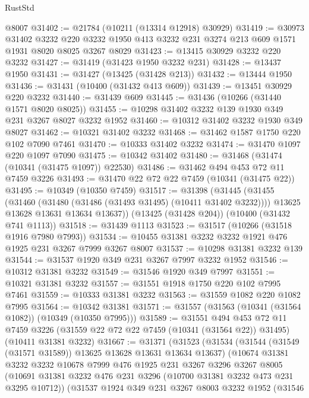 \begin{lexlean}{RustStd}
\begin{coremodule}
{\begin{coremodule}
{{{{{{{{{{{{{{{{{{{{{{{{{    @8007
@31402 := @21784 (@10211 (@13314 @12918) @30929)
@31419 := @30973
    @31402
    @3232
    @220
    @3232
    @1950
    @413
    @3232
    @231
    @3274
    @213
    @609
    @1571
    @1931
    @8020
    @8025
    @3267
    @8029
@31423 := @13415 @30929 @3232 @220 @3232
@31427 := @31419 (@31423 @1950 @3232 @231)
@31428 := @13437 @1950
@31431 := @31427 (@13425 (@31428 @213))
@31432 := @13444 @1950
@31436 := @31431 (@10400 (@31432 @413 @609))
@31439 := @13451 @30929 @220 @3232
@31440 := @31439 @609
@31445 := @31436 (@10266 (@31440 @1571 @8020 @8025))
@31455 := @10298 @31402 @3232 @139 @1930 @349 @231 @3267 @8027 @3232 @1952
@31460 := @10312 @31402 @3232 @1930 @349 @8027
@31462 := @10321 @31402 @3232
@31468 := @31462 @1587 @1750 @220 @102 @7090 @7461
@31470 := @10333 @31402 @3232
@31474 := @31470 @1097 @220 @1097 @7090
@31475 := @10342 @31402
@31480 := @31468 (@31474 (@10341 (@31475 @1097)) @22530)
@31486 := @31462 @494 @453 @72 @11 @7459 @3226
@31493 := @31470 @22 @72 @22 @7459 (@10341 (@31475 @22))
@31495 := @10349 (@10350 @7459)
@31517 := @31398
    (@31445
      (@31455
        (@31460 (@31480 (@31486 (@31493 @31495) (@10411 @31402 @3232))))
        @13625
        @13628
        @13631
        @13634
        @13637))
    (@13425 (@31428 @204))
    (@10400 (@31432 @741 @1113))
@31518 := @31439 @1113
@31523 := @31517 (@10266 (@31518 @1916 @7980 @7993))
@31534 := @10455 @31381 @3232 @3232 @1921 @476 @1925 @231 @3267 @7999 @3267 @8007
@31537 := @10298 @31381 @3232 @139
@31544 := @31537 @1920 @349 @231 @3267 @7997 @3232 @1952
@31546 := @10312 @31381 @3232
@31549 := @31546 @1920 @349 @7997
@31551 := @10321 @31381 @3232
@31557 := @31551 @1918 @1750 @220 @102 @7995 @7461
@31559 := @10333 @31381 @3232
@31563 := @31559 @1082 @220 @1082 @7995
@31564 := @10342 @31381
@31571 := @31557 (@31563 (@10341 (@31564 @1082)) (@10349 (@10350 @7995)))
@31589 := @31551
    @494
    @453
    @72
    @11
    @7459
    @3226
    (@31559 @22 @72 @22 @7459 (@10341 (@31564 @22)) @31495)
    (@10411 @31381 @3232)
@31667 := @31371
    (@31523
      (@31534
        (@31544 (@31549 (@31571 @31589)) @13625 @13628 @13631 @13634 @13637)
        (@10674
          @31381
          @3232
          @3232
          @10678
          @7999
          @476
          @1925
          @231
          @3267
          @3296
          @3267
          @8005
          (@10691 @31381 @3232 @476 @231 @3296 (@10700 @31381 @3232 @473 @231 @3295 @10712))
          (@31537
            @1924
            @349
            @231
            @3267
            @8003
            @3232
            @1952
            (@31546
}}}}}}}}}}}}}}}}}}}}}}}}}
\end{coremodule}}
\end{coremodule}
\end{lexlean}
